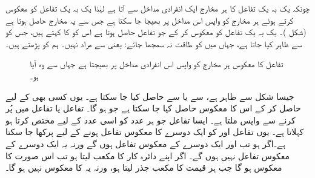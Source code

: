 چونکہ یک بہ یک تفاعل کا ہر مخارج   ایک انفرادی مداخل  سے آتا ہے لہٰذا یک بہ یک تفاعل کو معکوس کرتے ہوئے ہر مخارج کو واپس اس مداخل پر بھیجا جا سکتا ہے جس سے یہ مخارج حاصل ہوتا ہے (شکل )۔ یک بہ یک تفاعل  کو معکوس کر کے جو تفاعل حاصل ہوتا ہے اس کو  کا  کہتے ہیں، جس کو  سے ظاہر کیا جاتا ہے،  جہاں  میں  کو طاقت نہ سمجھا جائے: یعنی  سے مراد  نہیں۔ ہم  کو  پڑھتے ہیں۔
\begin{figure}
\centering
{}
\caption{
تفاعل  کا معکوس ہر مخارج کو واپس اس  انفرادی مداخل پر بھیجتا ہے جہاں سے وہ آیا  ہو۔
}
\label{شکل_ماورائی_الٹ_واپس_بھیجتا_ہے}
\end{figure}

جیسا شکل  سے ظاہر ہے،  سے  یا  سے  حاصل کیا جا سکتا ہے۔ یوں کسی بھی  کے لیے  حاصل کر کے اس  کا معکوس  حاصل کیا جا سکتا ہے جو  ہو گا۔ تفاعل  یا تفاعل  میں  پُر کرنے سے واپس  ملتا ہے۔ ایسا تفاعل جو ہر عدد کو اسی عدد کے لیے مختص کرتا ہو   کہلاتا ہے۔ یوں تفاعل  اور  کو ایک دوسرے  کا معکوس تفاعل ہونے کے لیے پرکھا جا سکتا ہے۔اگر  ہو تب  اور  ایک دوسرے کے معکوس تفاعل ہوں گے ورنہ یہ ایک دوسرے کے معکوس تفاعل نہیں ہوں گے۔ اگر  اپنے دائرہ کار کا مکعب لیتا ہو تب  اس صورت  کا معکوس ہو گا جب  ہر قیمت کا مکعب جذر لیتا ہو، ورنہ یہ  کا معکوس نہیں ہو گا۔

